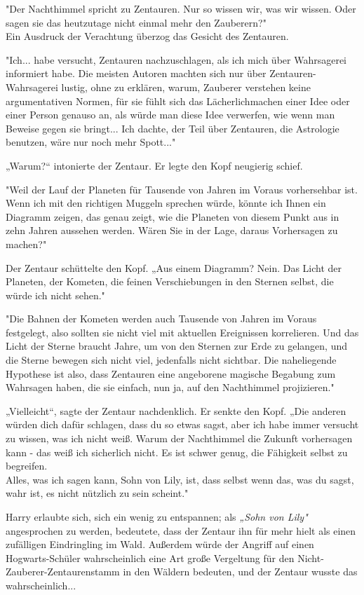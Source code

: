 {"Der Nachthimmel spricht zu Zentauren. Nur so wissen wir, was wir wissen. Oder sagen sie das heutzutage nicht einmal mehr den Zauberern?"\\ Ein Ausdruck der Verachtung überzog das Gesicht des Zentauren.

"Ich... habe versucht, Zentauren nachzuschlagen, als ich mich über Wahrsagerei informiert habe. Die meisten Autoren machten sich nur über Zentauren-Wahrsagerei lustig, ohne zu erklären, warum, Zauberer verstehen keine argumentativen Normen, für sie fühlt sich das Lächerlichmachen einer Idee oder einer Person genauso an, als würde man diese Idee verwerfen, wie wenn man Beweise gegen sie bringt... Ich dachte, der Teil über Zentauren, die Astrologie benutzen, wäre nur noch mehr Spott..."

„Warum?“ intonierte der Zentaur. Er legte den Kopf neugierig schief.

"Weil der Lauf der Planeten für Tausende von Jahren im Voraus vorhersehbar ist. Wenn ich mit den richtigen Muggeln sprechen würde, könnte ich Ihnen ein Diagramm zeigen, das genau zeigt, wie die Planeten von diesem Punkt aus in zehn Jahren aussehen werden. Wären Sie in der Lage, daraus Vorhersagen zu machen?"

Der Zentaur schüttelte den Kopf. „Aus einem Diagramm? Nein. Das Licht der Planeten, der Kometen, die feinen Verschiebungen in den Sternen selbst, die würde ich nicht sehen."

"Die Bahnen der Kometen werden auch Tausende von Jahren im Voraus festgelegt, also sollten sie nicht viel mit aktuellen Ereignissen korrelieren. Und das Licht der Sterne braucht Jahre, um von den Sternen zur Erde zu gelangen, und die Sterne bewegen sich nicht viel, jedenfalls nicht sichtbar. Die naheliegende Hypothese ist also, dass Zentauren eine angeborene magische Begabung zum Wahrsagen haben, die sie einfach, nun ja, auf den Nachthimmel projizieren."

„Vielleicht“, sagte der Zentaur nachdenklich. Er senkte den Kopf. „Die anderen würden dich dafür schlagen, dass du so etwas sagst, aber ich habe immer versucht zu wissen, was ich nicht weiß. Warum der Nachthimmel die Zukunft vorhersagen kann - das weiß ich sicherlich nicht. Es ist schwer genug, die Fähigkeit selbst zu begreifen.\\ Alles, was ich sagen kann, Sohn von Lily, ist, dass selbst wenn das, was du sagst, wahr ist, es nicht nützlich zu sein scheint."

Harry erlaubte sich, sich ein wenig zu entspannen; als \emph{„Sohn von Lily"} angesprochen zu werden, bedeutete, dass der Zentaur ihn für mehr hielt als einen zufälligen Eindringling im Wald. Außerdem würde der Angriff auf einen Hogwarts-Schüler wahrscheinlich eine Art große Vergeltung für den Nicht-Zauberer-Zentaurenstamm in den Wäldern bedeuten, und der Zentaur wusste das wahrscheinlich...

}
